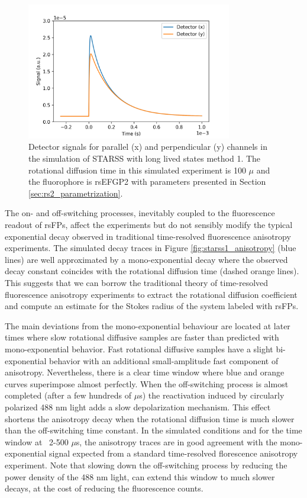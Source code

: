 \documentclass{article}
\begin{document}
\begin{figure}[h!]
    \centering 
    \includegraphics[width=0.8\textwidth]
    {figures/starss1_signal.png}
    \caption[Simulated detector signals of STARSS method 1]
    {Detector signals for parallel (x) and perpendicular (y) channels in the simulation of STARSS with long lived states method 1. The rotational diffusion time in this simulated experiment is 100 $\mu$ and the fluorophore is rsEFGP2 with parameters presented in Section \ref{sec:rs2_parametrization}.}
    \label{fig:starss1_signal}
\end{figure}

The on- and off-switching processes, inevitably coupled to the fluorescence readout of rsFPs, affect the experiments but do not sensibly modify the typical exponential decay observed in traditional time-resolved fluorescence anisotropy experiments. The simulated decay traces in Figure \ref{fig:starss1_anisotropy} (blue lines) are well approximated by a mono-exponential decay where the observed decay constant coincides with the rotational diffusion time (dashed orange lines). This suggests that we can borrow the traditional theory of time-resolved fluorescence anisotropy experiments \cite{LakowiczBook} to extract the rotational diffusion coefficient and compute an estimate for the Stokes radius of the system labeled with rsFPs.

The main deviations from the mono-exponential behaviour are located at later times where slow rotational diffusive samples are faster than predicted with mono-exponential behavior. Fast rotational diffusive samples have a slight bi-exponential behavior with an additional small-amplitude fast component of anisotropy. Nevertheless, there is a clear time window where blue and orange curves superimpose almost perfectly. When the off-switching process is almost completed (after a few hundreds of $\mu$s) the reactivation induced by circularly polarized 488 nm light adds a slow depolarization mechanism. This effect shortens the anisotropy decay when the rotational diffusion time is much slower than the off-switching time constant.
In the simulated conditions and for the time window at ~2-500 $\mu$s, the anisotropy traces are in good agreement with the mono-exponential signal expected from a standard time-resolved florescence anisotropy experiment. Note that slowing down the off-switching process by reducing the power density of the 488 nm light, can extend this window to much slower decays, at the cost of reducing the fluorescence counts.
\end{document}
